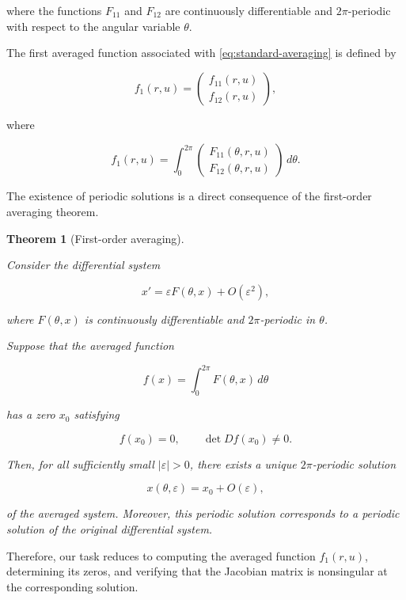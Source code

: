 \documentclass[11pt,reqno]{amsart}
\theoremstyle{plain}
\newtheorem{theorem}{Theorem}[section]
\theoremstyle{definition}
\theoremstyle{remark}
\begin{document}
where the functions $F_{11}$ and $F_{12}$ are continuously
differentiable and $2\pi$-periodic with respect to the angular
variable $\theta$.

The first averaged function associated with
\eqref{eq:standard-averaging} is defined by

\begin{equation}
\label{eq:first-averaged-definition}
f_1(r,u)
=
\begin{pmatrix}
f_{11}(r,u)
\\[2mm]
f_{12}(r,u)
\end{pmatrix},
\end{equation}

where

\begin{equation}
\label{eq:first-average-integral}
\boxed{
f_1(r,u)
=
\int_0^{2\pi}
\begin{pmatrix}
F_{11}(\theta,r,u)
\\[2mm]
F_{12}(\theta,r,u)
\end{pmatrix}
\,d\theta.
}
\end{equation}

The existence of periodic solutions is a direct consequence of the
first-order averaging theorem.

\begin{theorem}[First-order averaging]
\label{thm:averaging}

Consider the differential system

\[
x'
=
\varepsilon F(\theta,x)
+
O(\varepsilon^2),
\]

where $F(\theta,x)$ is continuously differentiable and
$2\pi$-periodic in $\theta$.

Suppose that the averaged function

\[
f(x)
=
\int_0^{2\pi}
F(\theta,x)\,d\theta
\]

has a zero $x_0$ satisfying

\[
f(x_0)=0,
\qquad
\det Df(x_0)\neq0.
\]

Then, for all sufficiently small $|\varepsilon|>0$, there exists a
unique $2\pi$-periodic solution

\[
x(\theta,\varepsilon)
=
x_0+O(\varepsilon),
\]

of the averaged system. Moreover, this periodic solution corresponds
to a periodic solution of the original differential system.
\end{theorem}

Therefore, our task reduces to computing the averaged function
$f_1(r,u)$, determining its zeros, and verifying that the Jacobian
matrix is nonsingular at the corresponding solution.
\end{document}

